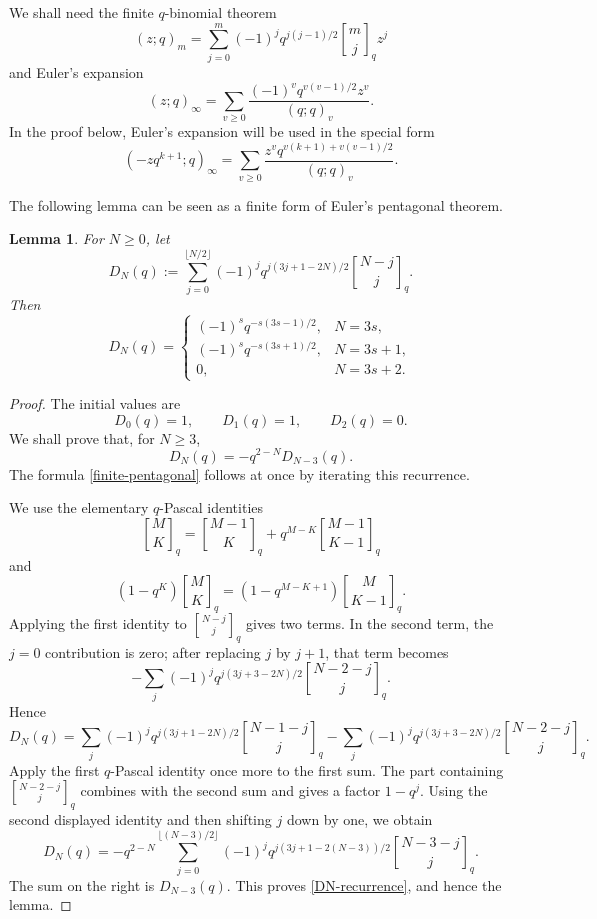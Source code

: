 \documentclass[11pt]{amsart}
\newtheorem{lemma}{Lemma}
\theoremstyle{remark}
\newcommand{\qbinom}[3][]{\genfrac{[}{]}{0pt}{}{#2}{#3}_{#1}}
\begin{document}
We shall need the finite $q$-binomial theorem~\cite[Eq. (3.3.6)]{AndrewsTheory}
\begin{equation}\label{finite-qbinom}
(z;q)_m=\sum_{j=0}^m(-1)^jq^{j(j-1)/2}\qbinom[q]{m}{j}z^j
\end{equation}
and Euler's expansion~\cite[Eq. (2.2.6)]{AndrewsTheory}
\begin{equation}\label{euler-expansion}
(z;q)_\infty=\sum_{v\ge0}\frac{(-1)^vq^{v(v-1)/2}z^v}{(q;q)_v}.
\end{equation}
In the proof below, Euler's expansion will be used in the special form
\begin{equation}\label{euler-used}
(-zq^{k+1};q)_\infty
=\sum_{v\ge0}\frac{z^vq^{v(k+1)+v(v-1)/2}}{(q;q)_v}.
\end{equation}

The following lemma can be seen as a finite form of Euler's pentagonal theorem.

\begin{lemma}\label{lem:pentagonal}
For $N\ge0$, let
\begin{equation}\label{DN}
D_N(q):=
\sum_{j=0}^{\lfloor N/2\rfloor}
(-1)^jq^{j(3j+1-2N)/2}\qbinom[q]{N-j}{j}.
\end{equation}
Then
\begin{equation}\label{finite-pentagonal}
D_N(q)=
\begin{cases}
(-1)^s q^{-s(3s-1)/2},&N=3s,\\[3pt]
(-1)^s q^{-s(3s+1)/2},&N=3s+1,\\[3pt]
0,&N=3s+2.
\end{cases}
\end{equation}
\end{lemma}

\begin{proof}
The initial values are
\[
D_0(q)=1,\qquad D_1(q)=1,\qquad D_2(q)=0.
\]
We shall prove that, for $N\ge3$,
\begin{equation}\label{DN-recurrence}
D_N(q)=-q^{2-N}D_{N-3}(q).
\end{equation}
The formula \eqref{finite-pentagonal} follows at once by iterating this recurrence.

We use the elementary $q$-Pascal identities~\cite[Eqs. (3.3.3)-(3.3.4)]{AndrewsTheory}
\[
\qbinom[q]{M}{K}=\qbinom[q]{M-1}{K}+q^{M-K}\qbinom[q]{M-1}{K-1}
\]
and
\[
(1-q^K)\qbinom[q]{M}{K}=(1-q^{M-K+1})\qbinom[q]{M}{K-1}.
\]
Applying the first identity to $\qbinom[q]{N-j}{j}$ gives two terms.  In the
second term, the $j=0$ contribution is zero; after replacing $j$ by $j+1$, that
term becomes
\[
-\sum_j(-1)^jq^{j(3j+3-2N)/2}\qbinom[q]{N-2-j}{j}.
\]
Hence
\[
D_N(q)=
\sum_j(-1)^jq^{j(3j+1-2N)/2}\qbinom[q]{N-1-j}{j}
-
\sum_j(-1)^jq^{j(3j+3-2N)/2}\qbinom[q]{N-2-j}{j}.
\]
Apply the first $q$-Pascal identity once more to the first sum.  The part containing
$\qbinom[q]{N-2-j}{j}$ combines with the second sum and gives a factor $1-q^j$.
Using the second displayed identity and then shifting $j$ down by one, we obtain
\[
D_N(q)=
-q^{2-N}
\sum_{j=0}^{\lfloor (N-3)/2\rfloor}
(-1)^jq^{j(3j+1-2(N-3))/2}\qbinom[q]{N-3-j}{j}.
\]
The sum on the right is $D_{N-3}(q)$.  This proves \eqref{DN-recurrence}, and hence the lemma.
\end{proof}
\end{document}
